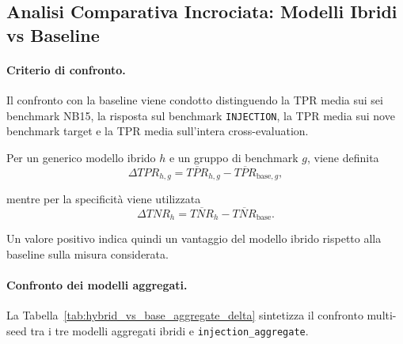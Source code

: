 
\subsection{Analisi Comparativa Incrociata: Modelli Ibridi vs Baseline}
\label{subsec:analisi_incrociata_ibridi_baseline}

\paragraph{Criterio di confronto.}
Il confronto con la baseline viene condotto distinguendo la TPR media sui sei benchmark NB15, la risposta sul benchmark \texttt{INJECTION}, la TPR media sui nove benchmark target e la TPR media sull'intera cross-evaluation.

Per un generico modello ibrido $h$ e un gruppo di benchmark $g$, viene definita
\begin{equation}
    \Delta TPR_{h,g}
    =
    \overline{TPR}_{h,g}
    -
    \overline{TPR}_{\mathrm{base},g},
    \label{eq:delta_tpr_hybrid_baseline}
\end{equation}

mentre per la specificità viene utilizzata
\begin{equation}
    \Delta TNR_h
    =
    \overline{TNR}_{h}
    -
    \overline{TNR}_{\mathrm{base}}.
    \label{eq:delta_tnr_hybrid_baseline}
\end{equation}

Un valore positivo indica quindi un vantaggio del modello ibrido rispetto alla baseline sulla misura considerata.

\paragraph{Confronto dei modelli aggregati.}
La Tabella~\ref{tab:hybrid_vs_base_aggregate_delta} sintetizza il confronto multi-seed tra i tre modelli aggregati ibridi e \texttt{injection\_aggregate}.

